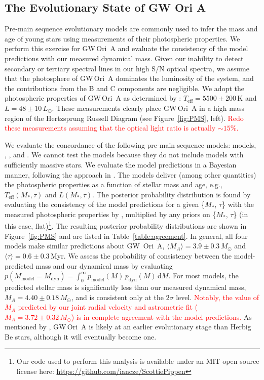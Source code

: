 \documentclass[twocolumn]{aastex61}
\newcommand{\todo}[1]{ \textcolor{red}{#1}}
\newcommand{\gw}{GW\,Ori}
\begin{document}
\subsection{The Evolutionary State of GW Ori A}
Pre-main sequence evolutionary models are commonly used to infer the mass and age of young stars using measurements of their photospheric properties. We perform this exercise for \gw~A and evaluate the consistency of the model predictions with our measured dynamical mass. Given our inability to detect secondary or tertiary spectral lines in our high S/N optical spectra, we assume that the photosphere of \gw~A dominates the luminosity of the system, and the contributions from the B and C components are negligible. We adopt the photospheric properties of \gw~A as determined by \citet{fang14}: $T_\mathrm{eff} = 5500 \pm 200\,\mathrm{K}$ and $L = 48 \pm 10\,L_\odot$. These measurements clearly place \gw~A in a high mass region of the Hertzsprung Russell Diagram (see Figure~\ref{fig:PMS}, left). \todo{Redo these measurements assuming that the optical light ratio is actually $\sim 15\%$.}

We evaluate the concordance of the following pre-main sequence models: \citet{choi16} models, \citet{dotter08}, \citet{tognelli11}, and \citet{siess00}. We cannot test the \citet{baraffe15} models because they do not include models with sufficiently massive stars. We evaluate the model predictions in a Bayesian manner, following the approach in \citet{jorgensen05,rosenfeld12b,czekala15a}. The models deliver (among other quantities) the photospheric properties as a function of stellar mass and age,
e.g., $T_\mathrm{eff}(M_\ast, \tau)$ and $L(M_\ast, \tau)$.
The posterior probability distribution is found by evaluating the consistency of the model predictions for a given \{$M_\ast$, $\tau$\} with the measured photospheric properties by \citet{fang14}, multiplied by any priors on  \{$M_\ast$, $\tau$\} (in this case, flat)\footnote{Our code used to perform this analysis is available under an MIT open source license here: \url{https://github.com/iancze/ScottiePippen}}.
The resulting posterior probability distributions are shown in Figure~\ref{fig:PMS} and are listed in Table~\ref{table:agreement}. In general, all four models make similar predictions about GW~Ori~A, $\langle M_A \rangle = 3.9 \pm 0.3\,M_\odot$ and $\langle \tau \rangle = 0.6 \pm 0.3\,$Myr. We assess the probability of consistency between the model-predicted mass and our dynamical mass by evaluating $p(M_\mathrm{model} = M_\mathrm{dyn}) = \int_0^\infty p_\mathrm{model}(M) \, p_\mathrm{dyn}(M) \, \mathrm{d}M$. For most models, the predicted stellar mass is significantly less than our measured dynamical mass, $M_A = 4.40 \pm 0.18\,M_\odot$, and is consistent only at the $2\sigma$ level. \todo{Notably, the value of $M_A$ predicted by our joint radial velocity and astrometric fit ($M_A = 3.72 \pm 0.32\,M_\odot$) is in complete agreement with the model predictions.} As mentioned by \citet{fang14}, \gw~A is likely at an earlier evolutionary stage than Herbig Be stars, although it will eventually become one.
\end{document}
